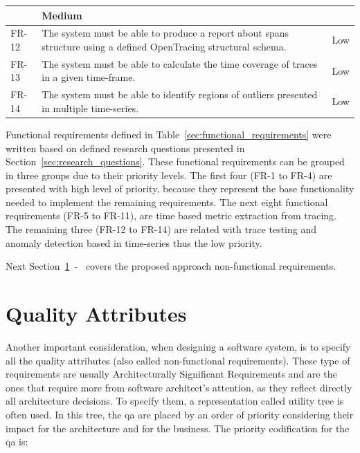 \begin{table}[H]
\begin{tabularx}{\linewidth} {
            |>{\hsize=0.10\hsize}X|
            >{\hsize=0.75\hsize}X|
            >{\hsize=0.15\hsize}X|}
         & Medium \\ \hline
         FR-12
         & The system must be able to produce a report about spans structure using a defined OpenTracing structural schema.
         & Low \\ \hline
         FR-13
         & The system must be able to calculate the time coverage of traces in a given time-frame.
         & Low \\ \hline
         FR-14
         & The system must be able to identify regions of outliers presented in multiple time-series.
         & Low \\ \hline
    \end{tabularx}
\end{table}

Functional requirements defined in Table~\ref{sec:functional_requirements} were written based on defined research questions presented in Section~\ref{sec:research_questions}. These functional requirements can be grouped in three groups due to their priority levels. The first four (FR-1 to FR-4) are presented with high level of priority, because they represent the base functionality needed to implement the remaining requirements. The next eight functional requirements (FR-5 to FR-11), are time based metric extraction from tracing. The remaining three (FR-12 to FR-14) are related with trace testing and anomaly detection based in time-series thus the low priority.

Next Section~\ref{sec:quality_attributes}~-~ covers the proposed approach non-functional requirements.

\section{Quality Attributes}
\label{sec:quality_attributes}

Another important consideration, when designing a software system, is to specify all the quality attributes (also called non-functional requirements). These type of requirements are usually Architecturally Significant Requirements and are the ones that require more from software architect's attention, as they reflect directly all architecture decisions. To specify them, a representation called utility tree is often used. In this tree, the \gls{qa} are placed by an order of priority considering their impact for the architecture and for the business. The priority codification for the \gls{qa} is:

